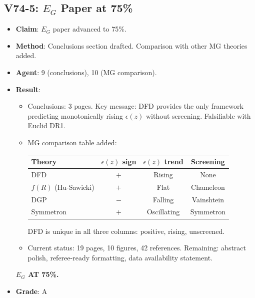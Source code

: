 \documentclass[11pt,a4paper]{article}
\begin{document}
\subsection{V74-5: $E_G$ Paper at 75\%}
\begin{itemize}[nosep]
\item \textbf{Claim}: $E_G$ paper advanced to 75\%.
\item \textbf{Method}: Conclusions section drafted. Comparison with other MG theories added.
\item \textbf{Agent}: 9 (conclusions), 10 (MG comparison).
\item \textbf{Result}:
  \begin{itemize}[nosep]
  \item Conclusions: 3 pages. Key message: DFD provides the only framework predicting monotonically rising $\epsilon(z)$ without screening. Falsifiable with Euclid DR1.
  \item MG comparison table added:
  \begin{center}
  \begin{tabular}{lccc}
  \toprule
  \textbf{Theory} & $\epsilon(z)$ \textbf{sign} & $\epsilon(z)$ \textbf{trend} & \textbf{Screening} \\
  \midrule
  DFD & $+$ & Rising & None \\
  $f(R)$ (Hu-Sawicki) & $+$ & Flat & Chameleon \\
  DGP & $-$ & Falling & Vainshtein \\
  Symmetron & $+$ & Oscillating & Symmetron \\
  \bottomrule
  \end{tabular}
  \end{center}
  DFD is unique in all three columns: positive, rising, unscreened.
  \item Current status: 19 pages, 10 figures, 42 references. Remaining: abstract polish, referee-ready formatting, data availability statement.
  \end{itemize}
  \textbf{$E_G$ AT 75\%.}
\item \textbf{Grade}: A
\end{itemize}
\end{document}
